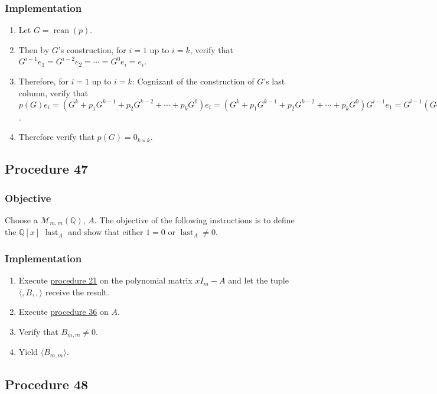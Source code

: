 \documentclass[twocolumn]{article}
\DeclareMathOperator{\rcan}{rcan}
\DeclareMathOperator{\last}{last}
\begin{document}
			\subsubsection{Implementation}
				\begin{enumerate}
					\item Let $G=\rcan(p)$.
					\item Then by $G$'s construction, for $i=1$ up to $i=k$, verify that $G^{i-1}e_1=G^{i-2}e_2=\cdots=G^{0}e_i=e_i$.
					\item Therefore, for $i=1$ up to $i=k$: Cognizant of the construction of $G$'s last column, verify that $p(G)e_i=(G^k+p_1G^{k-1}+p_2G^{k-2}+\cdots+p_kG^0)e_i=(G^k+p_1G^{k-1}+p_2G^{k-2}+\cdots+p_kG^0)G^{i-1}e_1=G^{i-1}(GG^{k-1}+p_1G^{k-1}+p_2G^{k-2}+\cdots+p_kG^0)e_1=G^{i-1}(Ge_k+p_1e_k+p_2e_{k-1}+\cdots+p_ke_1)=G^{i-1}0_{k\times 1}=0_{k\times 1}$.
					\item Therefore verify that $p(G)=0_{k\times k}$.
				\end{enumerate}
		\subsection{Procedure 47}\label{sec:procedure 47}
			\subsubsection{Objective}
				Choose a $\mathcal{M}_{m,m}(\mathbb{Q})$, $A$. The objective of the following instructions is to define the $\mathbb{Q}[x]$ $\last_A$ and show that either $1=0$ or $\last_A\ne 0$.
			\subsubsection{Implementation}
				\begin{enumerate}
					\item Execute \hyperref[sec:procedure 21]{procedure 21} on the polynomial matrix $xI_m-A$ and let the tuple $\langle,B,,\rangle$ receive the result.
					\item Execute \hyperref[sec:procedure 36]{procedure 36} on $A$.
					\item Verify that $B_{m,m}\ne 0$.
					\item Yield $\langle B_{m,m}\rangle$.
				\end{enumerate}
		\subsection{Procedure 48}\label{sec:procedure 48}
\end{document}
